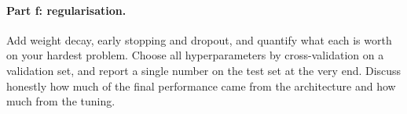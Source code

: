 \paragraph{Part f: regularisation.}
Add weight decay, early stopping and dropout, and quantify what each is worth
on your hardest problem.  Choose all hyperparameters by cross-validation on a
validation set, and report a single number on the test set at the very end.
Discuss honestly how much of the final performance came from the architecture
and how much from the tuning.

